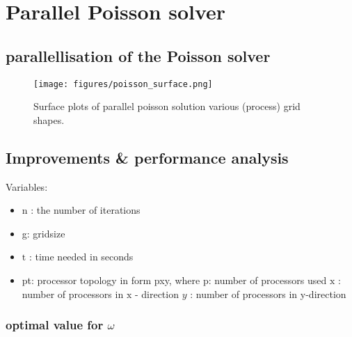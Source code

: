 \section{Parallel Poisson solver}

\subsection{parallellisation of the Poisson solver}
\begin{figure}[h]
    \centering
    \texttt{[image: figures/poisson\_surface.png]}
    \caption{Surface plots of parallel poisson solution various (process) grid shapes.}
    \label{fig:ppoisson_surface}
\end{figure}

\subsection{Improvements \& performance analysis}
Variables:
\begin{itemize}
    \item $\mathrm{n}$ : the number of iterations
    \item g: gridsize
    \item $\mathrm{t}$ : time needed in seconds
    \item pt: processor topology in form pxy, where p: number of processors used $\mathrm{x}$ : number of processors in $\mathrm{x}$ - direction $y$ : number of processors in y-direction
\end{itemize}

\subsubsection{optimal value for $\omega$}
